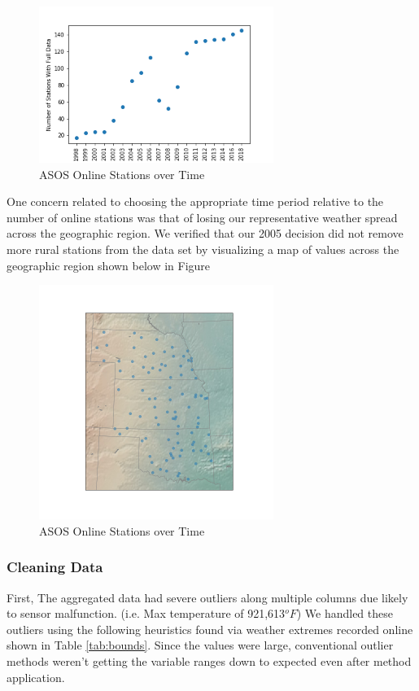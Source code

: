 \documentclass[twoside,11pt]{article}
\begin{document}
	\begin{figure}[htbp]
		\centering
		\includegraphics[width=3in]{ASOSstations.png}
		\caption{ASOS Online Stations over Time}
		\label{fig:asosstations}
	\end{figure}

	One concern related to choosing the appropriate time period relative to the number of online stations was that of losing our representative weather spread across the geographic region. We verified that our 2005 decision did not remove more rural stations from the data set by visualizing a map of values across the geographic region shown below in Figure 
	
	\begin{figure}[htbp]
		\centering
		\includegraphics[width=3in]{ASOSspread.png}
		\caption{ASOS Online Stations over Time}
		\label{fig:asosspread}
	\end{figure}
	
	\subsubsection{Cleaning Data}
	First, The aggregated data had severe outliers along multiple columns due likely to sensor malfunction. (i.e. Max temperature of 921,613$^oF$) We handled these outliers using the following heuristics found via weather extremes recorded online shown in Table \ref{tab:bounds}. Since the values were large, conventional outlier methods weren't getting the variable ranges down to expected even after method application.  
\end{document}
